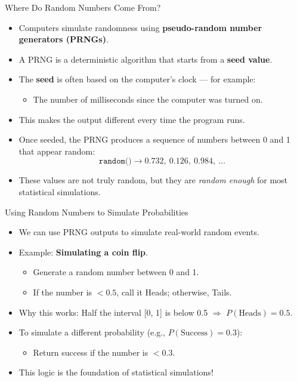 \documentclass[]{beamer} %
\begin{document}
\begin{frame}{Where Do Random Numbers Come From?}
    \begin{itemize}
        \item Computers simulate randomness using \textbf{pseudo-random number generators (PRNGs)}.
        \item A PRNG is a deterministic algorithm that starts from a \textbf{seed value}.
        \item The \textbf{seed} is often based on the computer’s clock — for example:
            \begin{itemize}
                \item The number of milliseconds since the computer was turned on.
            \end{itemize}
        \item This makes the output different every time the program runs.
        \item Once seeded, the PRNG produces a sequence of numbers between 0 and 1 that appear random:
\[
                \texttt{random()} \rightarrow 0.732,\ 0.126,\ 0.984,\ \ldots
\]
        \item These values are not truly random, but they are \textit{random enough} for most statistical simulations.
    \end{itemize}
\end{frame}

\begin{frame}{Using Random Numbers to Simulate Probabilities}
    \begin{itemize}
        \item We can use PRNG outputs to simulate real-world random events.
        \item Example: \textbf{Simulating a coin flip}.
            \begin{itemize}
                \item Generate a random number between 0 and 1.
                \item If the number is $< 0.5$, call it Heads; otherwise, Tails.
            \end{itemize}
        \item Why this works: Half the interval [0, 1] is below 0.5 $\Rightarrow$ $P(\text{Heads}) = 0.5$.
        \item To simulate a different probability (e.g., $P(\text{Success}) = 0.3$):
            \begin{itemize}
                \item Return success if the number is $< 0.3$.
            \end{itemize}
        \item This logic is the foundation of statistical simulations!
    \end{itemize}
\end{frame}
\end{document}
